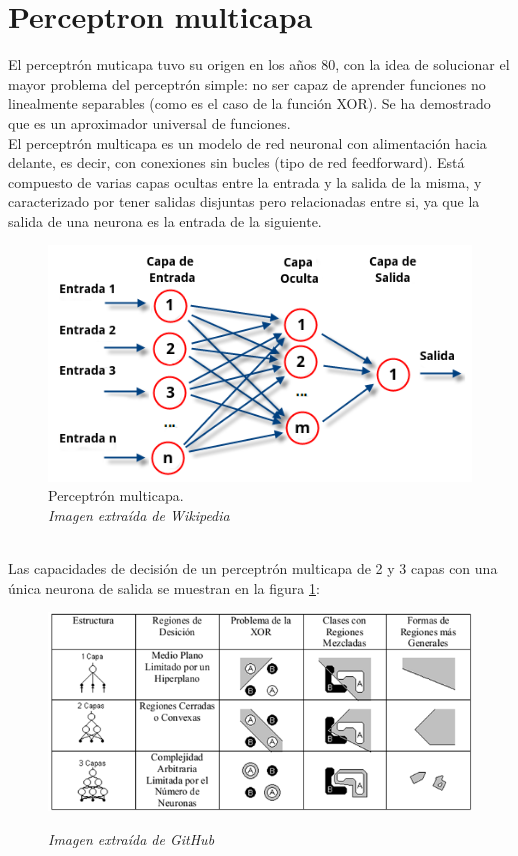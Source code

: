 \section {Perceptron multicapa}
El perceptrón muticapa tuvo su origen en los años 80, con la idea de solucionar el mayor problema del perceptrón simple: no ser capaz de aprender funciones no linealmente separables (como es el caso de la función XOR). Se ha demostrado que es un aproximador universal de funciones.
\\El perceptrón multicapa es un modelo de red neuronal con alimentación hacia delante, es decir, con conexiones sin bucles (tipo de red feedforward). Está compuesto de varias capas ocultas entre la entrada y la salida de la misma, y caracterizado por tener salidas disjuntas pero relacionadas entre si, ya que la salida de una neurona es la entrada de la siguiente.
\begin{figure}[htp]
\centering
\includegraphics[scale=1.2]{images/multilayerperceptron.png}
\caption{Perceptrón multicapa.\\\textit{Imagen extraída de Wikipedia}}
\end{figure}
\\Las capacidades de decisión de un perceptrón multicapa de 2 y 3 capas con una única neurona de salida se muestran en la figura \ref{perceptron23capas}:
\begin{figure}[htp]
\centering
\includegraphics[scale=0.7]{images/perceptron23capas.png}
\label{perceptron23capas}
\caption{\textit{Imagen extraída de GitHub}}
\end{figure}
